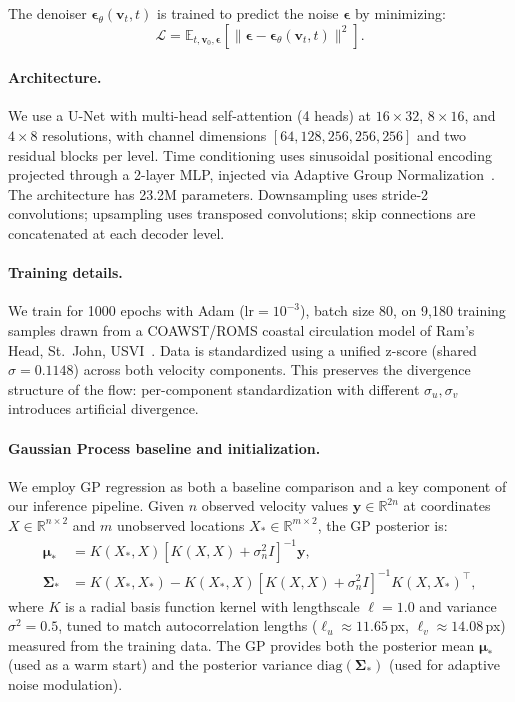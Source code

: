 \documentclass{article}
\begin{document}
The denoiser $\boldsymbol{\epsilon}_\theta(\mathbf{v}_t, t)$ is trained to predict the noise $\boldsymbol{\epsilon}$ by minimizing:
\begin{equation}
    \mathcal{L} = \mathbb{E}_{t, \mathbf{v}_0, \boldsymbol{\epsilon}}\left[\|\boldsymbol{\epsilon} - \boldsymbol{\epsilon}_\theta(\mathbf{v}_t, t)\|^2\right].
    \label{eq:loss}
\end{equation}

\paragraph{Architecture.} We use a U-Net with multi-head self-attention (4 heads) at $16 \times 32$, $8 \times 16$, and $4 \times 8$ resolutions, with channel dimensions $[64, 128, 256, 256, 256]$ and two residual blocks per level. Time conditioning uses sinusoidal positional encoding projected through a 2-layer MLP, injected via Adaptive Group Normalization~\citep{dhariwal2021diffusion}. The architecture has 23.2M parameters. Downsampling uses stride-2 convolutions; upsampling uses transposed convolutions; skip connections are concatenated at each decoder level.

\paragraph{Training details.} We train for 1000 epochs with Adam ($\text{lr} = 10^{-3}$), batch size 80, on 9{,}180 training samples drawn from a COAWST/ROMS coastal circulation model of Ram's Head, St.\ John, USVI~\citep{caley2024domain}. Data is standardized using a unified z-score (shared $\sigma = 0.1148$) across both velocity components. This preserves the divergence structure of the flow: per-component standardization with different $\sigma_u, \sigma_v$ introduces artificial divergence.

\paragraph{Gaussian Process baseline and initialization.}
We employ GP regression as both a baseline comparison and a key component of our inference pipeline. Given $n$ observed velocity values $\mathbf{y} \in \mathbb{R}^{2n}$ at coordinates $X \in \mathbb{R}^{n \times 2}$ and $m$ unobserved locations $X_* \in \mathbb{R}^{m \times 2}$, the GP posterior is:
\begin{align}
    \boldsymbol{\mu}_* &= K(X_*, X)\left[K(X, X) + \sigma_n^2 I\right]^{-1}\mathbf{y}, \label{eq:gp_mean}\\
    \boldsymbol{\Sigma}_* &= K(X_*, X_*) - K(X_*, X)\left[K(X, X) + \sigma_n^2 I\right]^{-1}K(X, X_*)^{\top}, \label{eq:gp_var}
\end{align}
where $K$ is a radial basis function kernel with lengthscale $\ell = 1.0$ and variance $\sigma^2 = 0.5$, tuned to match autocorrelation lengths ($\ell_u \approx 11.65$\,px, $\ell_v \approx 14.08$\,px) measured from the training data. The GP provides both the posterior mean $\boldsymbol{\mu}_*$ (used as a warm start) and the posterior variance $\text{diag}(\boldsymbol{\Sigma}_*)$ (used for adaptive noise modulation).
\end{document}
